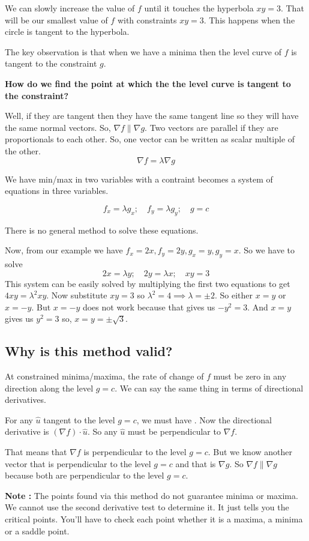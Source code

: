 We can slowly increase the value of $f$ until it touches the hyperbola $xy = 3$.
That will be our smallest value of $f$ with constraints $xy = 3$.
This happens when the circle is tangent to the hyperbola.

The key observation is that when we have a minima then the level curve of $f$ is tangent to the constraint $g$.

{\bf How do we find the point at which the the level curve is tangent to the constraint?}

Well, if they are tangent then they have the same tangent line so they will have the same normal vectors.
So, $\nabla f \parallel \nabla g$. Two vectors are parallel if they are proportionals to each other. 
So, one vector can be written as scalar multiple of the other.
$$ \nabla f = \lambda \nabla g $$

We have min/max in two variables with a contraint becomes a system of equations in three variables.

$$
    f_x  = \lambda g_x ; \quad
    f_y  = \lambda g_y ; \quad
    g  = c
$$

There is no general method to solve these equations.

Now, from our example we have $f_x = 2x, f_y = 2y, g_x = y, g_y = x$. So we have to solve
$$
    2x = \lambda y ; \quad
    2y = \lambda x ; \quad
    xy = 3 
$$
This system can be easily solved by multiplying the first two equations to get $4xy = \lambda ^ 2 xy$. 
Now substitute $xy = 3$ so $\lambda ^ 2 = 4 \implies \lambda = \pm 2$. So either $x = y$ or $x = -y$.
But $x = -y$ does not work because that gives us $-y^2 = 3$. 
And $x = y$ gives us $y^2 = 3$ so, $x = y = \pm \sqrt{3}$.


\subsection*{Why is this method valid?}

At constrained minima/maxima, the rate of change of $f$ must be zero in any direction along the level $g = c$.
We can say the same thing in terms of directional derivatives.

For any $\hat{u}$ tangent to the level $g = c$, we must have . 
Now the directional derivative is $(\nabla f) \cdot \hat{u}$. So any $\hat{u}$ must be perpendicular to $\nabla f$.

That means that $\nabla f$ is perpendicular to the level $g = c$. 
But we know another vector that is perpendicular to the level $g = c$ and that is  $\nabla g$.
So $\nabla f \parallel \nabla g$ because both are perpendicular to the level $g = c$.


{\bf Note : } The points found via this method do not guarantee minima or maxima. 
We cannot use the second derivative test to determine it. It just tells you the critical points.
You'll have to check each point whether it is a maxima, a minima or a saddle point.
